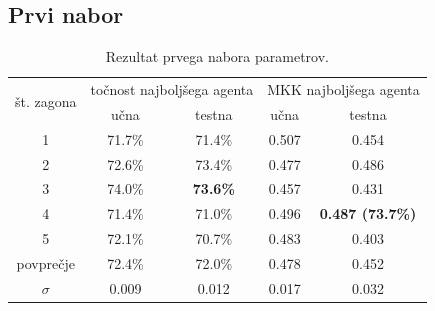 \subsection{Prvi nabor}\label{subsec:dodatek-car-prvi-nabor}
\begin{table}[H]
    \begin{center}
        \begin{tabular}{|| c | c c || c c ||}
            \hline
            \multirow{2}{*}{št. zagona} & \multicolumn{2}{c||}{točnost najboljšega agenta} & \multicolumn{2}{c||}{MKK najboljšega agenta} \\ \cline{2-5}
            & učna   & testna          & učna  & testna                  \\
            \hline
            1         & 71.7\% & 71.4\%          & 0.507 & 0.454                   \\
            \hline
            2         & 72.6\% & 73.4\%          & 0.477 & 0.486                   \\
            \hline
            3         & 74.0\% & \textbf{73.6\%} & 0.457 & 0.431                   \\
            \hline
            4         & 71.4\% & 71.0\%          & 0.496 & \textbf{0.487 (73.7\%)} \\
            \hline
            5         & 72.1\% & 70.7\%          & 0.483 & 0.403                   \\
            \hline
            povprečje & 72.4\% & 72.0\%          & 0.478 & 0.452                   \\
            \hline
            $\sigma$  & 0.009  & 0.012           & 0.017 & 0.032                   \\
            \hline
        \end{tabular}
    \end{center}
    \caption{Rezultat prvega nabora parametrov.}
    \label{tab:car_result_1}
\end{table}

